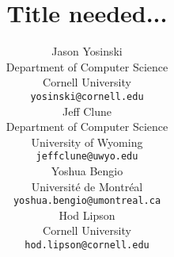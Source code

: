 \documentclass{article} %
\title{Title needed...}
\author{
Jason Yosinski \\
Department of Computer Science\\
Cornell University \\
\texttt{yosinski@cornell.edu} \\
\And
Jeff Clune \\
Department of Computer Science \\
University of Wyoming \\
\texttt{jeffclune@uwyo.edu} \\
\AND
Yoshua Bengio \\
Universit\'{e} de Montr\'{e}al \\
\texttt{yoshua.bengio@umontreal.ca} \\
\And
Hod Lipson \\
Cornell University \\
\texttt{hod.lipson@cornell.edu} \\
}
\begin{document}
\maketitle

\begin{abstract}

\end{abstract}





%



{\small
%


}
\end{document}
